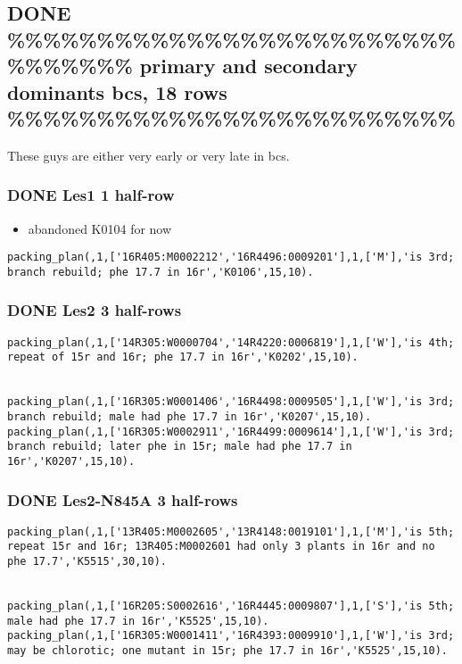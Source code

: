 \documentclass[11pt]{article}
\begin{document}
\subsection{{\bfseries\sffamily DONE} \%\%\%\%\%\%\%\%\%\%\%\%\%\%\%\%\%\%\%\%\%\%\%\%\%\%\%\%\%\%\%\% primary and secondary dominants bcs, 18 rows \%\%\%\%\%\%\%\%\%\%\%\%\%\%\%\%\%\%\%\%\%\%\%\%\%}
\label{sec-4-5}

These guys are either very early or very late in bcs.


\subsubsection{{\bfseries\sffamily DONE} Les1 1 half-row}
\label{sec-4-5-1}

\begin{itemize}
\item abandoned K0104 for now
\end{itemize}

\begin{verbatim}
packing_plan(,1,['16R405:M0002212','16R4496:0009201'],1,['M'],'is 3rd; branch rebuild; phe 17.7 in 16r','K0106',15,10).
\end{verbatim}





\subsubsection{{\bfseries\sffamily DONE} Les2 3 half-rows}
\label{sec-4-5-2}

\begin{verbatim}
packing_plan(,1,['14R305:W0000704','14R4220:0006819'],1,['W'],'is 4th; repeat of 15r and 16r; phe 17.7 in 16r','K0202',15,10).


packing_plan(,1,['16R305:W0001406','16R4498:0009505'],1,['W'],'is 3rd; branch rebuild; male had phe 17.7 in 16r','K0207',15,10).
packing_plan(,1,['16R305:W0002911','16R4499:0009614'],1,['W'],'is 3rd; branch rebuild; later phe in 15r; male had phe 17.7 in 16r','K0207',15,10).
\end{verbatim}


\subsubsection{{\bfseries\sffamily DONE} Les2-N845A 3 half-rows}
\label{sec-4-5-3}

\begin{verbatim}
packing_plan(,1,['13R405:M0002605','13R4148:0019101'],1,['M'],'is 5th; repeat 15r and 16r; 13R405:M0002601 had only 3 plants in 16r and no phe 17.7','K5515',30,10).


packing_plan(,1,['16R205:S0002616','16R4445:0009807'],1,['S'],'is 5th; male had phe 17.7 in 16r','K5525',15,10).
packing_plan(,1,['16R305:W0001411','16R4393:0009910'],1,['W'],'is 3rd; may be chlorotic; one mutant in 15r; phe 17.7 in 16r','K5525',15,10).
\end{verbatim}
\end{document}
